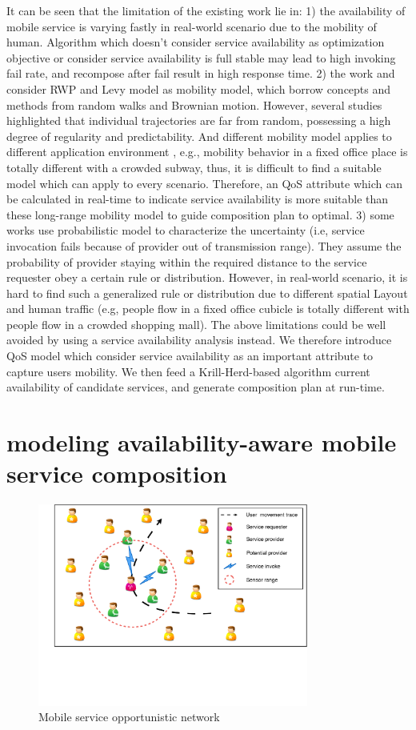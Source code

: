 \documentclass[10pt,journal,compsoc]{IEEEtran}
\begin{document}
It can be seen that the limitation of the existing work lie in: 1) the availability of mobile service is varying fastly in real-world scenario due to the mobility of human. Algorithm which doesn't consider service availability as optimization objective or consider service availability is full stable may lead to high invoking fail rate, and recompose after fail result in high response time. 2) the work \cite{sadiq2015service} and \cite{Deng2017} consider RWP and  Levy model as mobility model, which borrow concepts and methods from random walks and Brownian motion. However, several studies \cite{barbosa2017human} \cite{bettstetter2003node} \cite{navidi2004improving} highlighted that individual trajectories are far from random, possessing a high degree of regularity and predictability. And different mobility model applies to different application environment \cite{camp2002survey}, e.g., mobility behavior in a fixed office place is totally different with a crowded subway, thus, it is difficult to find a suitable model which can apply to every scenario. Therefore, an QoS attribute which can be calculated in real-time to indicate service availability is more suitable than these long-range mobility model to guide composition plan to optimal. 3) some works \cite{wang2011exploiting} \cite{Deng2016-2} use probabilistic model to characterize the uncertainty (i.e, service invocation fails because of provider out of transmission range). They assume the probability of provider staying within the required distance to the service requester obey a certain rule or distribution. However, in real-world scenario, it is hard to find such a generalized rule or distribution due to different spatial Layout and human traffic (e.g, people flow in a fixed office cubicle is totally different with people flow in a crowded shopping mall). 
The above limitations could be well avoided by using a service availability analysis instead. We therefore introduce QoS model which consider service availability as an important attribute to capture users mobility. We then feed a Krill-Herd-based algorithm current availability of candidate services, and generate composition plan at run-time.

\section{modeling availability-aware mobile service composition}
\begin{figure}[!t]
\centering
\includegraphics[width=3.5in]{./img/pic2.pdf}
\caption{Mobile service opportunistic network}
\label{fig_mson}
\end{figure}
\end{document}
